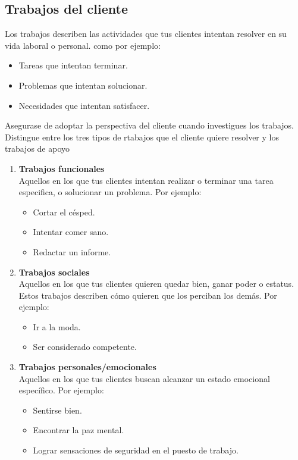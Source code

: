 \documentclass[11pt]{book}
\begin{document}
\subsection{Trabajos del cliente}
Los trabajos describen las actividades que tus clientes intentan resolver en su vida laboral o personal. como por ejemplo:
\begin{itemize}
\item Tareas que intentan terminar.
\item Problemas que intentan solucionar.
\item Necesidades que intentan satisfacer.
\end{itemize}
Asegurase de adoptar la perspectiva del cliente cuando investigues los trabajos.
Distingue entre los tres tipos de rtabajos que el cliente quiere resolver y los trabajos de apoyo
\begin{enumerate}
\item \textbf{Trabajos funcionales}\\
Aquellos en los que tus clientes intentan realizar o terminar una tarea especifica, o solucionar un problema. Por ejemplo: \\
\begin{itemize}
\item Cortar el césped.
\item Intentar comer sano.
\item Redactar un informe.
\end{itemize}
\item \textbf{Trabajos sociales}\\
Aquellos en los que tus clientes quieren quedar bien, ganar poder o estatus. Estos trabajos describen cómo quieren que los perciban los demás. Por ejemplo:
\begin{itemize}
\item Ir a la moda. 
\item Ser considerado competente.
\end{itemize} 

\item \textbf{Trabajos personales/emocionales}\\
Aquellos en los que tus clientes buscan alcanzar un estado emocional específico. Por ejemplo:
\begin{itemize}
\item Sentirse bien.
\item Encontrar la paz mental.
\item Lograr sensaciones de seguridad en el puesto de trabajo.
\end{itemize}

\end{enumerate}
\end{document}

